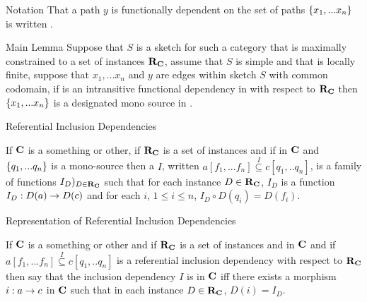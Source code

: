 \documentclass[xcolor=pst,dvips]{beamer}
\begin{document}
\begin{frame}{Notation}
That a path  $y$ is functionally dependent on the set of paths $\left\{x_1,...x_n\right\}$ 
is written  .
\end{frame}

\begin{frame}{Main Lemma}
Suppose that $S$ is a sketch for such a category \catcw that 
is maximally constrained to a set of instances $\textbf{R}_{\textbf{C}}$, assume that $S$ is simple and that \catcw is locally finite,
suppose that $x_1,...x_n$ and $y$ are edges
 within sketch $S$ with common codomain, 
if  is an intransitive functional dependency in \catcw  with respect to $\textbf{R}_{\textbf{C}}$
 then $\left\{x_1,...x_n\right\}$ is a designated mono source in \catc.
\end{frame}

\begin{frame}{Referential Inclusion Dependencies}
\begin{definition}
If $\textbf{C}$ is a something or other, if $\textbf{R}_{\textbf{C}}$ is a set of instances 
and if \fnsourceqnsource in $\textbf{C}$ and  $\left\{q_1,...q_n\right\}$ is a mono-source
 then a  $I$, written $a[f_1,...f_n] \overset{I}{\subseteq} c[q_1,..q_n]$, 
 is a family of functions $I_D)_{D \in \textbf{R}_{\textbf{C}}}$
such that for each instance $D \in \textbf{R}_{\textbf{C}}$, $I_D$ is a function $I_D : D(a) \rightarrow D(c)$ and
for each $i$, $1 \leq i \le n$, $I_D \circ D(q_i) = D(f_i)$.
\end{definition}
\end{frame}

\begin{frame}{Representation of Referential Inclusion Dependencies}
\begin{definition}
If $\textbf{C}$ is a something or other
and if $\textbf{R}_{\textbf{C}}$ is a set of instances
and \fnsourceqnsource in $\textbf{C}$ 
and if $a[f_1,...f_n] \overset{I}{\subseteq} c[q_1,..q_n]$ is a referential inclusion dependency
with respect  to $\textbf{R}_{\textbf{C}}$ 
then say that the inclusion dependency $I$ is  in $\textbf{C}$
iff there exists a morphism $i:a \rightarrow c$ in $\textbf{C}$ such that in each instance $D \in \textbf{R}_{\textbf{C}}$, $D(i) = I_D$. 
\end{definition}
\end{frame}
\end{document}

